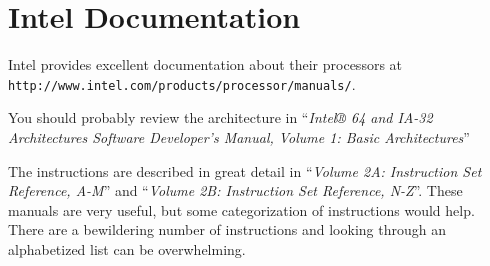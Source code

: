 \documentclass[11pt,b5paper]{book}
\begin{document}
\section{Intel Documentation}

Intel provides excellent documentation about their processors at\\
{\tt http://www.intel.com/products/processor/manuals/}.

You should probably review the architecture in
``{\it Intel® 64 and IA-32 Architectures Software Developer's Manual,
Volume 1: Basic Architectures}''

The instructions are described in great detail in
``{\it Volume 2A: Instruction Set Reference, A-M}''
and
``{\it Volume 2B: Instruction Set Reference, N-Z}''.
These manuals are very useful, but some categorization of instructions
would help.
There are a bewildering number of instructions and looking through an
alphabetized list can be overwhelming.



\backmatter
\printindex
\end{document}
